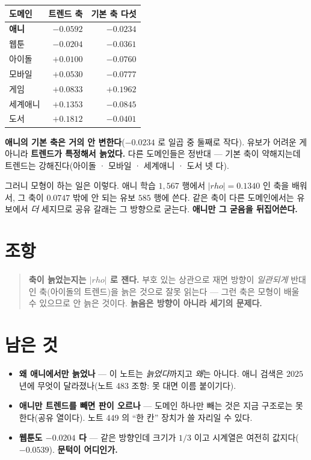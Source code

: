 \documentclass[11pt]{article}
\begin{document}
\begin{center}
\begin{tabular}{lrr}
\hline
도메인 & 트렌드 축 & 기본 축 다섯 \\
\hline
\textbf{애니} & $\mathbf{-0.0592}$ & $\mathbf{-0.0234}$ \\
웹툰 & $-0.0204$ & $-0.0361$ \\
아이돌 & $+0.0100$ & $-0.0760$ \\
모바일 & $+0.0530$ & $-0.0777$ \\
게임 & $+0.0833$ & $+0.1962$ \\
세계애니 & $+0.1353$ & $-0.0845$ \\
도서 & $+0.1812$ & $-0.0401$ \\
\hline
\end{tabular}
\end{center}

\textbf{애니의 기본 축은 거의 안 변한다}($-0.0234$ 로 일곱 중 둘째로
작다). 유보가 어려운 게 아니라 \textbf{트렌드가 특정해서 늙었다.} 다른
도메인들은 정반대 --- 기본 축이 약해지는데 트렌드는 강해진다(아이돌 ·
모바일 · 세계애니 · 도서 넷 다).

그러니 모형이 하는 일은 이렇다. 애니 학습 $1{,}567$ 행에서 $|rho| =
0.1340$ 인 축을 배워서, 그 축이 $0.0747$ 밖에 안 되는 유보 $585$ 행에
쓴다. 같은 축이 다른 도메인에서는 유보에서 \emph{더} 세지므로 공유 갈래는
그 방향으로 굳는다. \textbf{애니만 그 굳음을 뒤집어쓴다.}

\section*{조항}

\begin{quote}
\textbf{축이 늙었는지는 $|rho|$ 로 잰다.} 부호 있는 상관으로 재면 방향이
\emph{일관되게} 반대인 축(아이돌의 트렌드)을 늙은 것으로 잘못 읽는다 ---
그런 축은 모형이 배울 수 있으므로 안 늙은 것이다. \textbf{늙음은 방향이
아니라 세기의 문제다.}
\end{quote}

\section*{남은 것}

\begin{itemize}
\item \textbf{왜 애니에서만 늙었나} --- 이 노트는 \emph{늙었다}까지고
\emph{왜}는 아니다. 애니 검색은 $2025$ 년에 무엇이 달라졌나(노트 483
조항: 못 대면 이름 붙이기다).
\item \textbf{애니만 트렌드를 빼면 판이 오르나} --- 도메인 하나만 빼는
것은 지금 구조로는 못 한다(공유 열이다). 노트 449 의 ``한 칸'' 장치가
쓸 자리일 수 있다.
\item \textbf{웹툰도 $-0.0204$ 다} --- 같은 방향인데 크기가 $1/3$ 이고
시계열은 여전히 값지다($-0.0539$). \textbf{문턱이 어디인가.}
\end{itemize}
\end{document}
